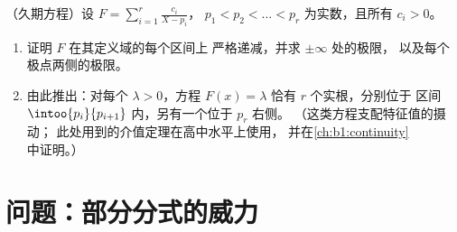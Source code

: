 \begin{exercise}[$\star\star\star$]\label{exo:b1:fractions:12}
（久期方程）设 $F = \sum_{i=1}^{r} \frac{c_i}{X - p_i}$，
$p_1 < p_2 < \dots < p_r$ 为实数，且所有 $c_i > 0$。
\begin{enumerate}
  \item 证明 $F$ 在其定义域的每个区间上
        严格递减，并求 $\pm\infty$ 处的极限，
        以及每个极点两侧的极限。
  \item 由此推出：对每个 $\lambda > 0$，方程 $F(x) =
        \lambda$ 恰有 $r$ 个实根，分别位于
        区间 $\intoo{p_i}{p_{i+1}}$ 内，另有一个位于 $p_r$ 右侧。
        （这类方程支配特征值的摄动；
        此处用到的介值定理在高中水平上使用，
        并在\cref{ch:b1:continuity}中证明。）
\end{enumerate}
\end{exercise}

\section{问题：部分分式的威力}

